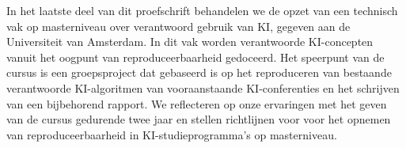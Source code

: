 In het laatste deel van dit proefschrift behandelen we de opzet van een technisch vak op masterniveau over verantwoord gebruik van KI, gegeven aan de Universiteit van Amsterdam. In dit vak worden verantwoorde KI-concepten vanuit het oogpunt van reproduceerbaarheid gedoceerd. Het speerpunt van de cursus is een groepsproject dat gebaseerd is op het reproduceren van bestaande verantwoorde KI-algoritmen van vooraanstaande KI-conferenties en het schrijven van een bijbehorend rapport. We reflecteren op onze ervaringen met het geven van de cursus gedurende twee jaar en stellen richtlijnen voor voor het opnemen van reproduceerbaarheid in KI-studieprogramma's op masterniveau.
